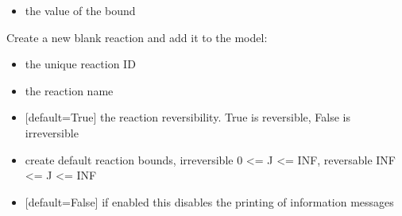 \documentclass[letterpaper,10pt,english]{sphinxmanual}
\begin{document}
\begin{fulllineitems}
\begin{fulllineitems}
\begin{itemize}
\item {} 
\sphinxAtStartPar
{} the value of the bound

\end{itemize}

\end{fulllineitems}


\begin{fulllineitems}
\label{\detokenize{modules_doc:cbmpy.CBModel.Model.createReactionNew}}
\pysigstartsignatures
{}
\pysigstopsignatures
\sphinxAtStartPar
Create a new blank reaction and add it to the model:
\begin{itemize}
\item {} 
\sphinxAtStartPar
{} the unique reaction ID

\item {} 
\sphinxAtStartPar
{} the reaction name

\item {} 
\sphinxAtStartPar
{} {[}default=True{]} the reaction reversibility. True is reversible, False is irreversible

\item {} 
\sphinxAtStartPar
{} create default reaction bounds, irreversible 0 \textless{}= J \textless{}= INF, reversable \sphinxhyphen{}INF \textless{}= J \textless{}= INF

\item {} 
\sphinxAtStartPar
{} {[}default=False{]} if enabled this disables the printing of information messages

\end{itemize}

\end{fulllineitems}


\end{fulllineitems}
\end{document}
